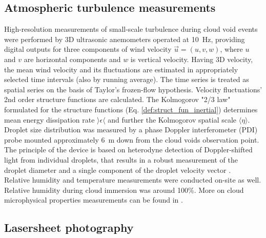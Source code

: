 \documentclass[../main.tex]{subfiles}
\begin{document}
 \subsection{Atmospheric turbulence measurements}
High-resolution measurements of small-scale turbulence during cloud void events were performed by 3D ultrasonic anemometers operated at 10~Hz, providing digital outputs for three components of wind velocity $\vec{u}=(u,v,w)$, where $u$ and $v$ are horizontal components and $w$ is vertical velocity. Having 3D velocity, the mean wind velocity and its fluctuations are estimated in appropriately selected time intervals (also by running average). The time series is treated as spatial series on the basis of Taylor’s frozen-flow hypothesis. Velocity fluctuations' 2nd order structure functions are calculated. The Kolmogorov "2/3 law" formulated for the structure functions (Eq. \ref{def:struct_fun_inertial}) determines mean energy dissipation rate $\rangle\epsilon\langle$ and further the Kolmogorov spatial scale $\langle\eta\rangle$.\\
Droplet size distribution was measured by a phase Doppler interferometer (PDI) probe mounted approximately 6~m down from the cloud voids observation point. The principle of the device is based on heterodyne detection of Doppler-shifted light from individual droplets, that results in a robust measurement of the droplet diameter and a single component of the droplet velocity vector \citep{Chuang2008}.\\
Relative humidity and temperature measurements were conducted on-site as well. Relative humidity during cloud immersion was around 100\%. More on cloud microphysical properties measurements can be found in \citet{Siebert2015}.\\

\subsection{Lasersheet photography}
\end{document}
